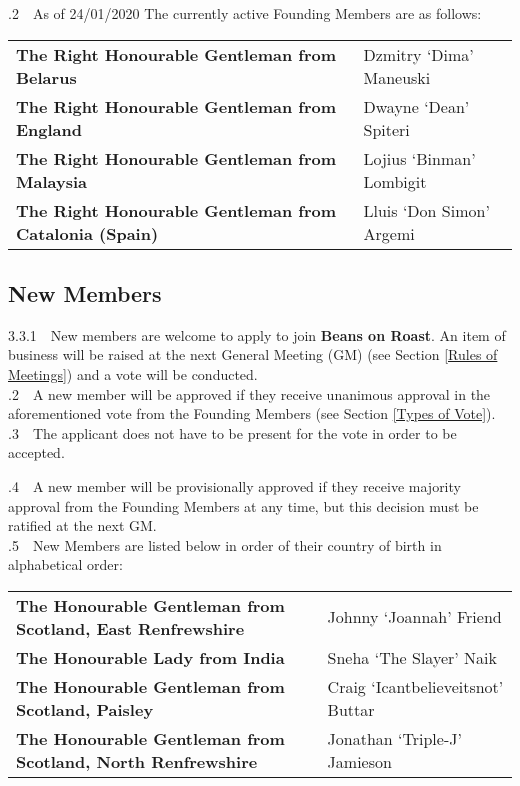 \documentclass[a4paper,11pt]{article}
\begin{document}
.2$\quad$As of 24/01/2020 The currently active Founding Members are as follows: 

\begin{table}[h!]
\begin{tabular}{ll}
\textbf{The Right Honourable Gentleman from  Belarus} & Dzmitry `Dima'  Maneuski \\
\textbf{The Right Honourable Gentleman from England} & Dwayne `Dean' Spiteri \\
\textbf{The Right Honourable Gentleman from Malaysia} & Lojius `Binman' Lombigit \\
\textbf{The Right Honourable Gentleman from Catalonia (Spain)} & Lluis `Don Simon' Argemi \\
\end{tabular}
\end{table}

\subsection{New Members}
\label{New Members}
3.3.1$\quad$New members are welcome to apply to join \textbf{Beans on Roast}. An item of business will be raised at the next General Meeting (GM) (see Section \ref{Rules of Meetings}) and a vote will be conducted.\\ 

.2$\quad$A new member will be approved if they receive unanimous approval in the aforementioned vote from the Founding Members (see Section \ref{Types of Vote}). \\

.3$\quad$The applicant does not have to be present for the vote in order to be accepted. 

.4$\quad$A new member will be provisionally approved if they receive majority approval from the Founding Members at any time, but this decision must be ratified at the next GM. \\

.5$\quad$New Members are listed below in order of their country of birth in alphabetical order: 
\begin{table}[h!]
\begin{tabular}{ll}
\textbf{The Honourable Gentleman from  Scotland, East Renfrewshire} & Johnny `Joannah' Friend \\
\textbf{The Honourable Lady from India} & Sneha `The Slayer' Naik \\
\textbf{The Honourable Gentleman from Scotland, Paisley} & Craig `Icantbelieveitsnot' Buttar\\
\textbf{The Honourable Gentleman from Scotland, North Renfrewshire} & Jonathan `Triple-J' Jamieson
\end{tabular}
\end{table}
\end{document}
